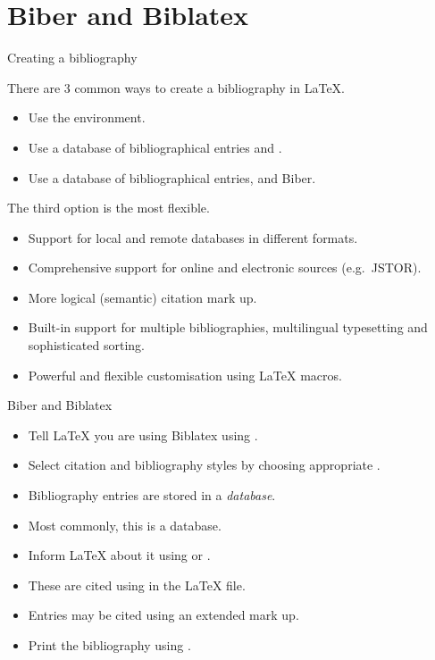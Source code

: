 \overleaf

\section{Biber and Biblatex}

\begin{frame}{Creating a bibliography}

  There are 3 common ways to create a bibliography in \LaTeX{}.
  \begin{itemize}
    \item Use the  environment.
    \item Use a database of bibliographical entries and \BibTeX{}.
    \item Use a database of bibliographical entries,  and Biber.
  \end{itemize}

  The third option is the most flexible.
  \begin{itemize}
    \item Support for local and remote databases in different formats.
    \item Comprehensive support for online and electronic sources (e.g.~JSTOR).
    \item More logical (semantic) citation mark up.
    \item Built-in support for multiple bibliographies, multilingual typesetting and sophisticated sorting.
    \item Powerful and flexible customisation using \LaTeX{} macros.
  \end{itemize}

\end{frame}

\begin{frame}{Biber and Biblatex}

    \begin{itemize}
      \item Tell \LaTeX{} you are using Biblatex using .
      \item Select citation and bibliography styles by choosing appropriate .
      \item Bibliography entries are stored in a \emph{database}.
      \item Most commonly, this is a \emph{\BibTeX{}} database.
      \item Inform \LaTeX{} about it using  or .
      \item These are cited using  in the \LaTeX{} file.
      \item Entries may be cited using an extended mark up.
      \item Print the bibliography using .
    \end{itemize}

\end{frame}

